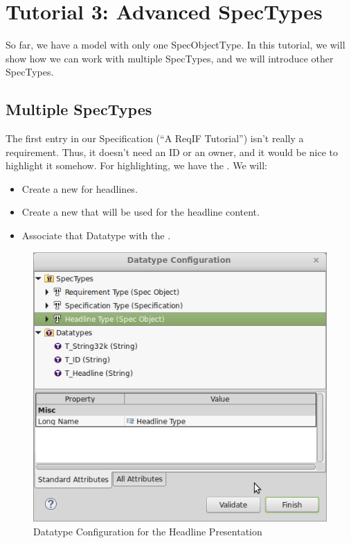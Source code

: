 \section{Tutorial 3: Advanced SpecTypes}
\label{sec:tutorial-spec-types}

So far, we have a model with only one SpecObjectType.  In this tutorial, we will show how we can work with multiple SpecTypes, and we will introduce other SpecTypes.

\subsection{Multiple SpecTypes}
\label{sec:multiple-spec-types}

The first entry in our Specification (``A ReqIF Tutorial'') isn't really a requirement.  Thus, it doesn't need an ID or an owner, and it would be nice to highlight it somehow.  For highlighting, we have the .  We will:

\begin{itemize}

\item
  Create a new  for headlines.
\item
  Create a new  that will be used for the headline content.
\item
  Associate that Datatype with the .
\end{itemize}

\begin{figure}
\centering      
\includegraphics[width=0.8\linewidth]{../rmf-images/datatype_Headline_desc.png}      
\caption{Datatype Configuration for the Headline Presentation}      
\label{fig:headlineConfig}
\end{figure}

